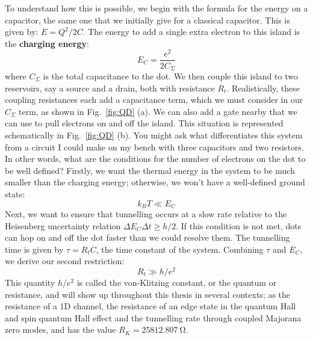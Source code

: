 To understand how this is possible, we begin with the formula for the energy on a capacitor, the same one that
we initially give for a classical capacitor. This is given by: $E = Q^2/2C$. The energy to add a single extra electron
to this island is the \textbf{charging energy}:
\begin{equation}
  E_C = \frac{e^2}{2 C_{\Sigma}}
\end{equation}
where $C_\Sigma$ is the total capacitance to the dot. We then couple this island to two reservoirs, say a source
and a drain, both with resistance $R_t$. Realistically, these coupling resistances each add a capacitance term, which
we must consider in our $C_\Sigma$ term, as shown in Fig.~\ref{fig:QD} (a). We can also add a gate nearby that we can use to pull electrons on and off
the island. This situation is represented schematically in Fig.~\ref{fig:QD} (b). You might ask what differentiates
this system from a circuit I could make on my bench with three capacitors and two resistors. In other words, what are
the conditions for the number of electrons on the dot to be well defined? Firstly, we want the thermal energy
in the system to be much smaller than the charging energy; otherwise, we won't have a well-defined ground state:
\begin{equation}
  k_B T \ll E_C
\end{equation}
Next, we want to ensure that tunnelling occurs at a slow rate relative to the Heisenberg uncertainty relation
$\Delta E_C \Delta t \geq h/2$. If this condition is not met, dots can hop on and off the dot faster than we could resolve them.
The tunnelling time is given by $\tau = R_t C$, the time constant of the system. Combining $\tau$ and $E_C$,
we derive our second restriction:
\begin{equation}
  R_t \gg h/e^2
\end{equation}
This quantity $h/e^2$ is called the von-Klitzing constant, or the quantum or resistance, and will show up
throughout this thesis in several contexts; as the resistance of a 1D channel, the resistance of an edge
state in the quantum Hall and spin quantum Hall effect and the tunnelling rate through coupled Majorana zero modes,
and has the value $R_K = \SI{25812.807}{\ohm}$.

